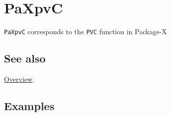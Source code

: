\documentclass[../FeynHelpersManual.tex]{subfiles}
\begin{document}
\hypertarget{paxpvc}{
\section{PaXpvC}\label{paxpvc}}

\texttt{PaXpvC} corresponds to the \texttt{PVC} function in Package-X

\subsection{See also}

\hyperlink{toc}{Overview}.

\subsection{Examples}
\end{document}
